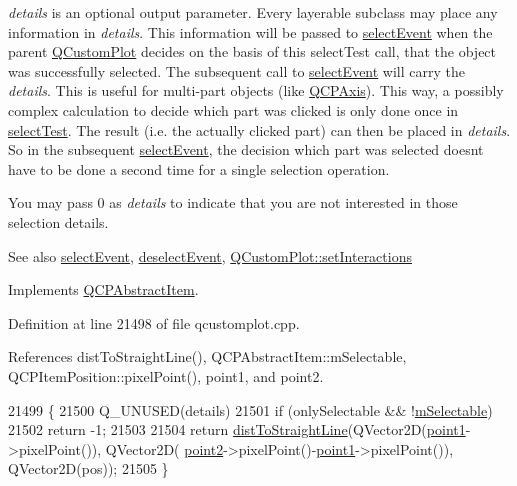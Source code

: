 {\itshape details} is an optional output parameter. Every layerable subclass may place any information in {\itshape details}. This information will be passed to \hyperlink{class_q_c_p_abstract_item_aaf92af7b9893712959a6c073d334d88d}{select\+Event} when the parent \hyperlink{class_q_custom_plot}{Q\+Custom\+Plot} decides on the basis of this select\+Test call, that the object was successfully selected. The subsequent call to \hyperlink{class_q_c_p_abstract_item_aaf92af7b9893712959a6c073d334d88d}{select\+Event} will carry the {\itshape details}. This is useful for multi-\/part objects (like \hyperlink{class_q_c_p_axis}{Q\+C\+P\+Axis}). This way, a possibly complex calculation to decide which part was clicked is only done once in \hyperlink{class_q_c_p_item_straight_line_a64cc3796f58ce856012732603edb2f1c}{select\+Test}. The result (i.\+e. the actually clicked part) can then be placed in {\itshape details}. So in the subsequent \hyperlink{class_q_c_p_abstract_item_aaf92af7b9893712959a6c073d334d88d}{select\+Event}, the decision which part was selected doesn\textquotesingle{}t have to be done a second time for a single selection operation.

You may pass 0 as {\itshape details} to indicate that you are not interested in those selection details.

\begin{DoxySeeAlso}{See also}
\hyperlink{class_q_c_p_abstract_item_aaf92af7b9893712959a6c073d334d88d}{select\+Event}, \hyperlink{class_q_c_p_abstract_item_a91f090d6763cfedb0749219c63788ae9}{deselect\+Event}, \hyperlink{class_q_custom_plot_a5ee1e2f6ae27419deca53e75907c27e5}{Q\+Custom\+Plot\+::set\+Interactions} 
\end{DoxySeeAlso}


Implements \hyperlink{class_q_c_p_abstract_item_a96d522d10ffc0413b9a366c6f7f0476b}{Q\+C\+P\+Abstract\+Item}.



Definition at line 21498 of file qcustomplot.\+cpp.



References dist\+To\+Straight\+Line(), Q\+C\+P\+Abstract\+Item\+::m\+Selectable, Q\+C\+P\+Item\+Position\+::pixel\+Point(), point1, and point2.


\begin{DoxyCode}
21499 \{
21500   Q\_UNUSED(details)
21501   if (onlySelectable && !\hyperlink{class_q_c_p_abstract_item_ad81eb35c8726a0f458db9df9732e0e41}{mSelectable})
21502     return -1;
21503   
21504   return \hyperlink{class_q_c_p_item_straight_line_adc9b6c5bd33c7f806b748b79dfa25926}{distToStraightLine}(QVector2D(\hyperlink{class_q_c_p_item_straight_line_ac131a6ffe456f2cc7364dce541fe0120}{point1}->pixelPoint()), QVector2D(
      \hyperlink{class_q_c_p_item_straight_line_ad26c0a732e471f63f75d481dcd48cfc9}{point2}->pixelPoint()-\hyperlink{class_q_c_p_item_straight_line_ac131a6ffe456f2cc7364dce541fe0120}{point1}->pixelPoint()), QVector2D(pos));
21505 \}
\end{DoxyCode}


